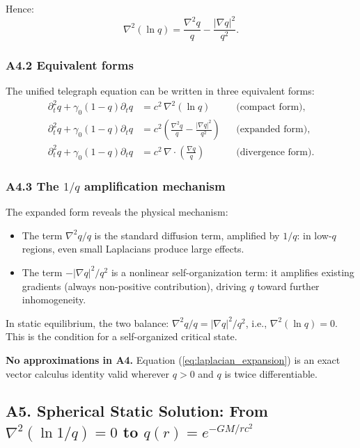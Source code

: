 \documentclass[reprint]{revtex4-2}
\begin{document}
Hence:
\begin{equation}
\boxed{\nabla^2(\ln q) = \frac{\nabla^2 q}{q} - \frac{|\nabla q|^2}{q^2}}.
\label{eq:laplacian_expansion}
\end{equation}

\subsubsection{A4.2 Equivalent forms}

The unified telegraph equation can be written in three equivalent forms:
\begin{align}
\partial_t^2 q + \gamma_0(1-q)\partial_t q &= c^2\,\nabla^2(\ln q) &&\text{(compact form)}, \\
\partial_t^2 q + \gamma_0(1-q)\partial_t q &= c^2\left(\frac{\nabla^2 q}{q} - \frac{|\nabla q|^2}{q^2}\right) &&\text{(expanded form)}, \\
\partial_t^2 q + \gamma_0(1-q)\partial_t q &= c^2\,\nabla\cdot\left(\frac{\nabla q}{q}\right) &&\text{(divergence form)}.
\end{align}

\subsubsection{A4.3 The $1/q$ amplification mechanism}

The expanded form reveals the physical mechanism:
\begin{itemize}
\item The term $\nabla^2 q/q$ is the standard diffusion term, amplified by $1/q$: in low-$q$ regions, even small Laplacians produce large effects.
\item The term $-|\nabla q|^2/q^2$ is a nonlinear self-organization term: it amplifies existing gradients (always non-positive contribution), driving $q$ toward further inhomogeneity.
\end{itemize}

In static equilibrium, the two balance: $\nabla^2 q/q = |\nabla q|^2/q^2$, i.e., $\nabla^2(\ln q)=0$. This is the condition for a self-organized critical state.

\textbf{No approximations in A4.} Equation (\ref{eq:laplacian_expansion}) is an exact vector calculus identity valid wherever $q>0$ and $q$ is twice differentiable.

\subsection{A5. Spherical Static Solution: From $\nabla^2(\ln 1/q)=0$ to $q(r)=e^{-GM/rc^2}$}
\end{document}
